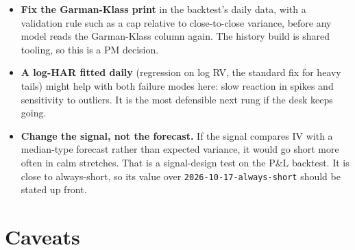 \documentclass{article}
\begin{document}
\begin{itemize}

\item \textbf{Fix the Garman-Klass print} in the backtest's daily data, with a validation rule such as a cap relative to close-to-close variance, before any model reads the Garman-Klass column again. The history build is shared tooling, so this is a PM decision.

\item \textbf{A log-HAR fitted daily} (regression on log RV, the standard fix for heavy tails) might help with both failure modes here: slow reaction in spikes and sensitivity to outliers. It is the most defensible next rung if the desk keeps going.

\item \textbf{Change the signal, not the forecast.} If the signal compares IV with a median-type forecast rather than expected variance, it would go short more often in calm stretches. That is a signal-design test on the P\&L backtest. It is close to always-short, so its value over \texttt{2026-\allowbreak{}10-\allowbreak{}17-\allowbreak{}always-\allowbreak{}short} should be stated up front.

\end{itemize}

\section{Caveats}
\end{document}
